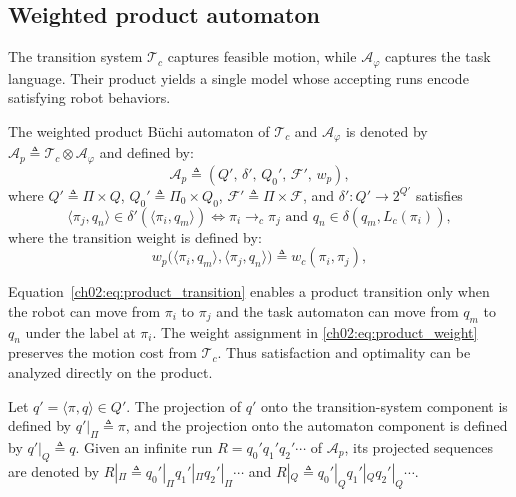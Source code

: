 \subsection{Weighted product automaton}
\label{ch02:subsec:product}

The transition system $\mathcal{T}_c$ captures feasible motion, while
$\mathcal{A}_{\varphi}$ captures the task language. Their product yields a
single model whose accepting runs encode satisfying robot behaviors.

\begin{definition}
\label{ch02:def:product}
The weighted product B\"uchi automaton of $\mathcal{T}_c$ and
$\mathcal{A}_{\varphi}$ is denoted by
$\mathcal{A}_{p} \triangleq \mathcal{T}_c \otimes \mathcal{A}_{\varphi}$ and
defined by:
\begin{equation}
\mathcal{A}_{p}
\triangleq
\left(Q',\,\delta',\,Q_0',\,\mathcal{F}',\,w_p\right),
\label{ch02:eq:product}
\end{equation}
where
$Q' \triangleq \Pi \times Q$,
$Q_0' \triangleq \Pi_0 \times Q_0$,
$\mathcal{F}' \triangleq \Pi \times \mathcal{F}$, and
$\delta' : Q' \to 2^{Q'}$ satisfies
\begin{equation}
\langle \pi_j,q_n \rangle \in \delta'(\langle \pi_i,q_m \rangle)
\iff
\pi_i \longrightarrow_c \pi_j
\text{ and }
q_n \in \delta\!\left(q_m,L_c(\pi_i)\right),
\label{ch02:eq:product_transition}
\end{equation}
where the transition weight is defined by:
\begin{equation}
w_p\bigl(\langle \pi_i,q_m \rangle,\langle \pi_j,q_n \rangle\bigr)
\triangleq
w_c(\pi_i,\pi_j),
\label{ch02:eq:product_weight}
\end{equation}
\end{definition}

Equation~\eqref{ch02:eq:product_transition} enables a product transition only
when the robot can move from $\pi_i$ to $\pi_j$ and the task automaton can move
from $q_m$ to $q_n$ under the label at $\pi_i$. The weight assignment in
\eqref{ch02:eq:product_weight} preserves the motion cost from $\mathcal{T}_c$.
Thus satisfaction and optimality can be analyzed directly on the product.

\begin{definition}
\label{ch02:def:projection}
Let $q' = \langle \pi,q \rangle \in Q'$. The projection of $q'$ onto the
transition-system component is defined by
$q'|_{\Pi} \triangleq \pi$, and the projection onto the automaton component is
defined by
$q'|_{Q} \triangleq q$.
Given an infinite run
$R = q_0'q_1'q_2'\cdots$ of $\mathcal{A}_p$, its projected sequences are
denoted by
$R|_{\Pi} \triangleq q_0'|_{\Pi}q_1'|_{\Pi}q_2'|_{\Pi}\cdots$
and
$R|_{Q} \triangleq q_0'|_{Q}q_1'|_{Q}q_2'|_{Q}\cdots$.
\end{definition}

